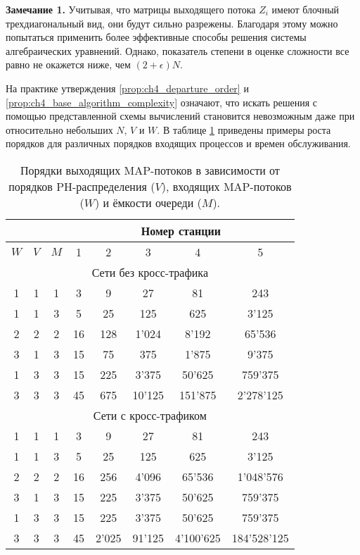 \textbf{Замечание 1.} Учитывая, что матрицы выходящего потока $Z_i$ имеют блочный трехдиагональный вид, они будут сильно разрежены. Благодаря этому можно попытаться применить более эффективные способы решения системы алгебраических уравнений. Однако, показатель степени в оценке сложности все равно не окажется ниже, чем $(2 + \epsilon) N$.


На практике утверждения \ref{prop:ch4_departure_order} и \ref{prop:ch4_base_algorithm_complexity} означают, что искать решения с помощью представленной схемы вычислений становится невозможным даже при относительно небольших $N$, $V$ и $W$. В таблице \ref{table:ch4_map_order_growth} приведены примеры роста порядков для различных порядков входящих процессов и времен обслуживания.

\begin{table}[h!]
\centering
\begin{tabular}{ |c|c|c||c|c|c|c|c| }
\hline
\multicolumn{3}{|c||}{} & \multicolumn{5}{c|}{Номер станции} \\
\hline
$W$ & $V$ & $M$ & 1 & 2 & 3 & 4 & 5\\
\hline
\multicolumn{8}{|c|}{Сети без кросс-трафика} \\
\hline
1 & 1 & 1 & 3 & 9 & 27 & 81 & 243 \\
1 & 1 & 3 & 5 & 25 & 125 & 625 & 3'125 \\
2 & 2 & 2 & 16 & 128 & 1'024 & 8'192 & 65'536 \\
3 & 1 & 3 & 15 & 75 & 375 & 1'875 & 9'375 \\
1 & 3 & 3 & 15 & 225 & 3'375 & 50'625 & 759'375 \\
3 & 3 & 3 & 45 & 675 & 10'125 & 151'875 & 2'278'125 \\
\hline
\multicolumn{8}{|c|}{Сети с кросс-трафиком} \\
\hline
1 & 1 & 1 & 3 & 9 & 27 & 81 & 243 \\
1 & 1 & 3 & 5 & 25 & 125 & 625 & 3'125 \\
2 & 2 & 2 & 16 & 256 & 4'096 & 65'536 & 1'048'576 \\
3 & 1 & 3 & 15 & 225 & 3'375 & 50'625 & 759'375 \\
1 & 3 & 3 & 15 & 225 & 3'375 & 50'625 & 759'375 \\
3 & 3 & 3 & 45 & 2'025 & 91'125 & 4'100'625 & 184'528'125 \\
\hline
\end{tabular}
\caption{Порядки выходящих MAP-потоков в зависимости от порядков PH-распределения ($V$), входящих MAP-потоков ($W$) и ёмкости очереди ($M$).\label{table:ch4_map_order_growth}
}
\end{table}

